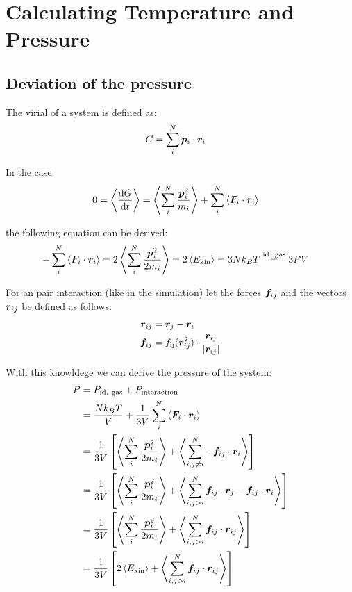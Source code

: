 \section{Calculating Temperature and Pressure}

\subsection*{Deviation of the pressure}

The virial of a system is defined as:
\begin{align}
G
	&=\sum_i^N\boldsymbol{p}_i\cdot\boldsymbol{r}_i
	\label{4p1}
\end{align}

In the case
\begin{align}
0
	&=\left\langle\frac{\text{d} G}{\text{d} t}\right\rangle 
	=\left\langle\sum_i^N\frac{\boldsymbol{p}_i^2}{m_i}\right\rangle+\sum_i^N\left\langle\boldsymbol{F}_i\cdot\boldsymbol{r}_i\right\rangle
	\label{4p2}
\end{align}

the following equation can be derived:
\begin{align}
-\sum_i^N\left\langle\boldsymbol{F}_i\cdot\boldsymbol{r}_i\right\rangle
	&=2\left\langle\sum_i^N\frac{\boldsymbol{p}_i^2}{2m_i}\right\rangle
	=2\left\langle E_\text{kin}\right\rangle
	=3Nk_BT
	\stackrel{\text{id. gas}}{=}3PV
	\label{4p3}
\end{align}

For an pair interaction (like in the simulation) let the forces $\boldsymbol{f}_{ij}$ and the vectors $\boldsymbol{r}_{ij}$ be defined as follows:
\begin{align}
\boldsymbol{r}_{ij}
	&=\boldsymbol{r}_{j} - \boldsymbol{r}_{i}
	\label{4rij}\\
\boldsymbol{f}_{ij} 
	&= f_\text{lj}(\boldsymbol{r}_{ij}^2)\cdot\frac{\boldsymbol{r}_{ij}}{\left| \boldsymbol{r}_{ij}\right|}
	\label{4fij}
\end{align}

With this knowldege we can derive the pressure of the system:
\begin{align}
P
	&=P_\text{id. gas} + P_\text{interaction}
	\label{4p4}\\
	&=\frac{Nk_BT}{V} + \frac{1}{3V}\sum_i^N\left\langle\boldsymbol{F}_i\cdot\boldsymbol{r}_i\right\rangle
	\label{4p5}\\
	&=\frac{1}{3V}\left[\left\langle\sum_i^N\frac{\boldsymbol{p}_i^2}{2m_i}\right\rangle + \left\langle\sum_{i,j\neq i}^N-\boldsymbol{f}_{ij}\cdot\boldsymbol{r}_i\right\rangle\right]
	\label{4p6}\\
	&=\frac{1}{3V}\left[\left\langle\sum_i^N\frac{\boldsymbol{p}_i^2}{2m_i}\right\rangle + \left\langle\sum_{i,j>i}^N\boldsymbol{f}_{ij}\cdot\boldsymbol{r}_{j}-\boldsymbol{f}_{ij}\cdot\boldsymbol{r}_{i}\right\rangle\right]
	\label{4p7}\\
	&=\frac{1}{3V}\left[\left\langle\sum_i^N\frac{\boldsymbol{p}_i^2}{2m_i}\right\rangle + \left\langle\sum_{i,j>i}^N\boldsymbol{f}_{ij}\cdot\boldsymbol{r}_{ij}\right\rangle\right]
	\label{4p8}\\
	&=\frac{1}{3V}\left[ 2\left\langle E_\text{kin}\right\rangle + \left\langle\sum_{i,j>i}^N\boldsymbol{f}_{ij}\cdot\boldsymbol{r}_{ij}\right\rangle\right]
	\label{4p9}
\end{align}